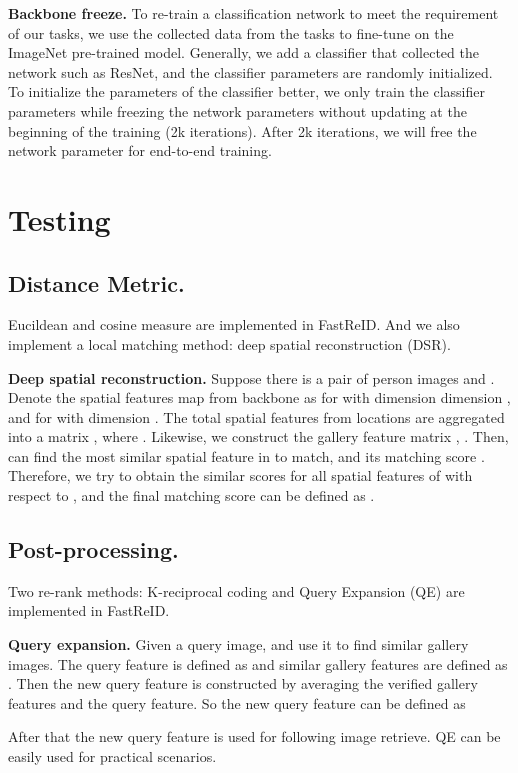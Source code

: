 \documentclass[10pt,twocolumn,letterpaper]{article}
\begin{document}
\noindent\textbf{Backbone freeze.} To re-train a classification network to meet the requirement of our tasks, we use the collected data from the tasks to fine-tune on the ImageNet pre-trained model. Generally, we add a classifier that collected the network such as ResNet, and the classifier parameters are randomly initialized. To initialize the parameters of the classifier better, we only train the classifier parameters while freezing the network parameters without updating at the beginning of the training (2k iterations). After 2k iterations, we will free the network parameter for end-to-end training.


\section{Testing}
\subsection{Distance Metric.} Eucildean and cosine measure are implemented in FastReID. And we also implement a local matching method: deep spatial reconstruction (DSR).

\noindent\textbf{Deep spatial reconstruction.} Suppose there is a pair of person images  and . Denote the spatial features map from backbone as  for   with dimension dimension ,  and  for    with dimension . The total  spatial features from  locations are aggregated into a matrix  , where . Likewise, we construct the gallery feature matrix , . Then,  can find the most similar spatial feature in  to match, and its matching score . Therefore, we try to obtain the similar scores for all spatial features of  with respect to , and the final matching score can be defined as .

\subsection{Post-processing.} Two re-rank methods: K-reciprocal coding \cite{zhong2017re} and Query Expansion (QE) \cite{bhagwan2004total} are implemented in FastReID.

\noindent\textbf{Query expansion.} Given a query image, and use it to find  similar gallery images. The query feature is defined as  and  similar gallery features are defined as . Then the new query feature is constructed by averaging the verified gallery features and the query feature. So the new query feature  can be defined as

After that the new query feature  is used for following image retrieve. QE can be easily used for practical scenarios.
\end{document}
